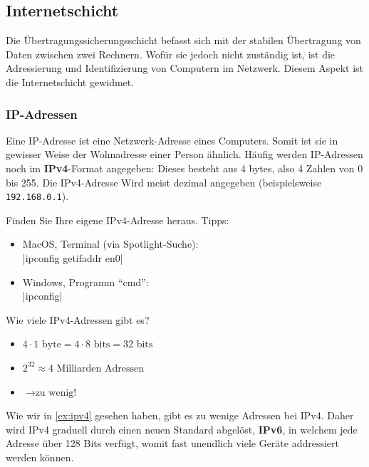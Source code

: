 \subsection{Internetschicht}
Die Übertragungssicherungsschicht befasst sich mit der stabilen Übertragung von Daten zwischen zwei Rechnern. Wofür sie jedoch nicht zuständig ist, ist die Adressierung und Identifizierung von Computern im Netzwerk. Diesem Aspekt ist die Internetschicht gewidmet.

\subsubsection{IP-Adressen}

Eine \acrfull{IP}-Adresse ist eine Netzwerk-Adresse eines Computers. Somit ist sie in gewisser Weise der Wohnadresse einer Person ähnlich. Häufig werden IP-Adressen noch im \textbf{IPv4}-Format angegeben: Dieses besteht aus 4 bytes, also 4 Zahlen von 0 bis 255. Die IPv4-Adresse Wird meist dezimal angegeben (beispielsweise \texttt{192.168.0.1}).
\begin{mysubmission}
	Finden Sie Ihre eigene IPv4-Adresse heraus. Tipps:
	\begin{itemize}
		\item MacOS, Terminal (via Spotlight-Suche): \\
		      \commandbox|ipconfig getifaddr en0|
		\item Windows, Programm ``cmd'': \\
		      \commandbox|ipconfig|
	\end{itemize}
\end{mysubmission}
\begin{myexercise}\label{ex:ipv4}
	Wie viele IPv4-Adressen gibt es?
	\begin{myanswer}
		\begin{itemize}
			\item $4\cdot 1 \text{ byte} = 4\cdot 8 \text{ bits} = 32 \text{ bits}$
			\item $2^{32} \approx 4 \text{ Milliarden Adressen}$
			\item $\rightarrow \text{zu wenig!}$
		\end{itemize}
	\end{myanswer}
\end{myexercise}
Wie wir in \cref{ex:ipv4} gesehen haben, gibt es zu wenige Adressen bei IPv4. Daher wird IPv4 graduell durch einen neuen Standard abgelöst, \textbf{IPv6}, in welchem jede Adresse über 128 Bits verfügt, womit fast unendlich viele Geräte addressiert werden können.

